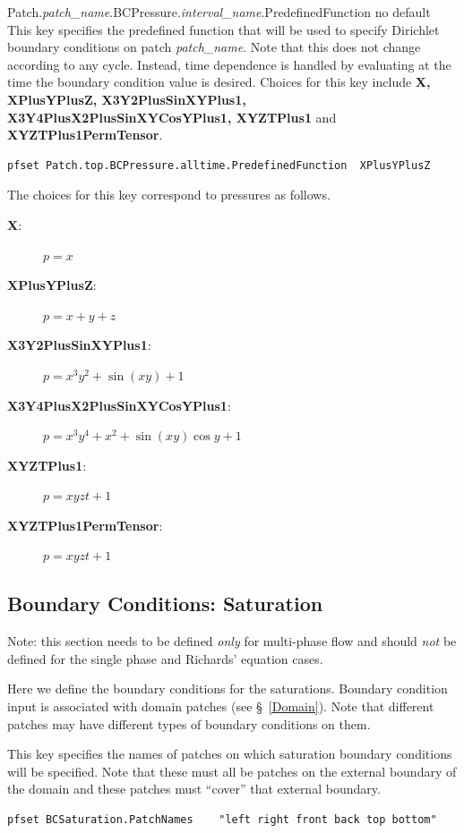 {Patch.{\em patch\_name}.BCPressure.{\em interval\_name}.PredefinedFunction}
{no default}
{This key specifies the predefined function that will be used to specify
Dirichlet boundary conditions on patch {\em patch\_name}.
Note that this does not change according to any cycle.
Instead, time dependence is handled by
evaluating at the time the boundary condition value is desired.
Choices for this key include {\bf X, XPlusYPlusZ, X3Y2PlusSinXYPlus1,
X3Y4PlusX2PlusSinXYCosYPlus1, XYZTPlus1} and {\bf XYZTPlus1PermTensor}.
}
\begin{display}\begin{verbatim}
pfset Patch.top.BCPressure.alltime.PredefinedFunction  XPlusYPlusZ
\end{verbatim}\end{display}
The choices for this key correspond to pressures as follows.
\begin{description}
\item[{\bf X}: ] $p = x$
\item[{\bf XPlusYPlusZ}: ] $p = x + y + z$
\item[{\bf X3Y2PlusSinXYPlus1}: ] $p = x^3 y^2 + \sin(xy) + 1$
\item[{\bf X3Y4PlusX2PlusSinXYCosYPlus1}: ]
$p = x^3 y^4 + x^2 + \sin(xy)\cos y + 1$
\item[{\bf XYZTPlus1}: ] $p = xyzt + 1$
\item[{\bf XYZTPlus1PermTensor}: ] $p = xyzt + 1$
\end{description}


\subsection{Boundary Conditions: Saturation}
\label{Boundary Conditions: Saturation}

Note: this section needs to be defined {\em only} for multi-phase flow
and should {\em not} be defined for the single phase and Richards'
equation cases.

Here we define the boundary conditions for the saturations.  Boundary
condition input is associated with domain patches (see \S~\ref{Domain}).
Note that different patches may have different types of boundary
conditions on them.

{
This key specifies the names of patches on which saturation boundary
conditions will be specified.  Note that these must all be patches on
the external boundary of the domain and these patches must ``cover''
that external boundary.
}
\begin{display}\begin{verbatim}
pfset BCSaturation.PatchNames    "left right front back top bottom"
\end{verbatim}\end{display}

